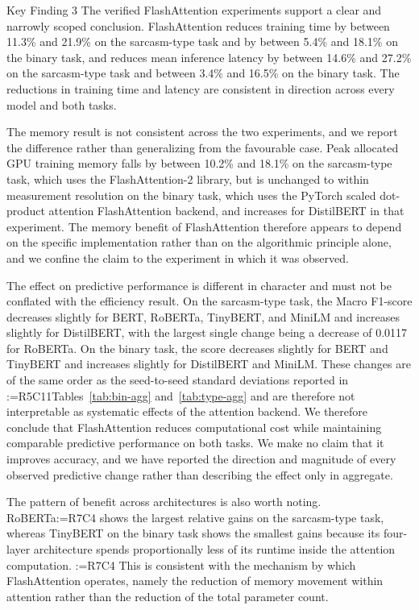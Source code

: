 \documentclass[a4paper,fleqn]{cas-sc}
\makeatletter
\newif\iftracked
\newcommand{\rv@setcolour}[1]{%
  \IfStrEq{#1}{R7C7}{\color{rvEdit}}{%
    \IfSubStr{#1}{R5}{\IfSubStr{#1}{R7}{\color{rvBoth}}{\color{rvFive}}}{\color{rvSeven}}}}
\newcommand{\rv@tag}[1]{\textsuperscript{\sffamily\bfseries\scriptsize[\StrSubstitute{#1}{,}{, }]}\,}
\newcommand{\rv@recordone}[1]{%
  \edef\rv@i{#1}%
  \ifcsdef{rv@n@\rv@i}{}{\csgdef{rv@n@\rv@i}{0}}%
  \csxdef{rv@n@\rv@i}{\the\numexpr\csuse{rv@n@\rv@i}+1\relax}%
  \begingroup\edef\@currentlabel{\rv@i}\label{rv:\rv@i:\csuse{rv@n@\rv@i}}\endgroup}
\newcommand{\rv@record}[1]{\@for\rv@id:=#1\do{\expandafter\rv@recordone\expandafter{\rv@id}}}
\DeclareRobustCommand{\rcdel}[2]{\rv@record{#1}\iftracked{\rv@setcolour{#1}\rv@tag{#1}\rv@strike{#2}}\else\unskip\fi}
\DeclareRobustCommand{\rcrep}[3]{\rv@record{#1}\iftracked{\rv@setcolour{#1}\rv@tag{#1}\rv@strike{#2} #3}\else#3\fi}
\DeclareRobustCommand{\rcnote}[2]{\rv@record{#1}\iftracked{\rv@setcolour{#1}\rv@tag{#1}\textit{[#2]}}\else\unskip\fi}
\makeatother
\begin{document}
\begin{keyfinding}{Key Finding 3}\label{box:kf3}
The verified FlashAttention experiments support a clear and narrowly scoped conclusion. FlashAttention reduces training time by between 11.3\% and 21.9\% on the sarcasm-type task and by between 5.4\% and 18.1\% on the binary task, and reduces mean inference latency by between 14.6\% and 27.2\% on the sarcasm-type task and between 3.4\% and 16.5\% on the binary task. The reductions in training time and latency are consistent in direction across every model and both tasks.

The memory result is not consistent across the two experiments, and we report the difference rather than generalizing from the favourable case. Peak allocated GPU training memory falls by between 10.2\% and 18.1\% on the sarcasm-type task, which uses the FlashAttention-2 library, but is unchanged to within measurement resolution on the binary task, which uses the PyTorch scaled dot-product attention FlashAttention backend, and increases for DistilBERT in that experiment. The memory benefit of FlashAttention therefore appears to depend on the specific implementation rather than on the algorithmic principle alone, and we confine the claim to the experiment in which it was observed.

The effect on predictive performance is different in character and must not be conflated with the efficiency result. On the sarcasm-type task, the Macro F1-score decreases slightly for BERT, RoBERTa, TinyBERT, and MiniLM and increases slightly for DistilBERT, with the largest single change being a decrease of 0.0117 for RoBERTa. On the binary task, the score decreases slightly for BERT and TinyBERT and increases slightly for DistilBERT and MiniLM. These changes are of the same order as the seed-to-seed standard deviations reported in \rcrep{R5C11}{Tables 6 and 8}{Tables~\ref{tab:bin-agg} and~\ref{tab:type-agg}} and are therefore not interpretable as systematic effects of the attention backend. We therefore conclude that FlashAttention reduces computational cost while maintaining comparable predictive performance on both tasks. We make no claim that it improves accuracy, and we have reported the direction and magnitude of every observed predictive change rather than describing the effect only in aggregate.

The pattern of benefit across architectures is also worth noting. RoBERTa\rcdel{R7C4}{, which uses the smallest batch size and consequently performs the largest number of attention operations per epoch,} shows the largest relative gains on the sarcasm-type task, whereas TinyBERT on the binary task shows the smallest gains because its four-layer architecture spends proportionally less of its runtime inside the attention computation. \rcnote{R7C4}{the deleted explanation contradicted Table~\ref{tab:hyper}, which gives the same batch size for every model} This is consistent with the mechanism by which FlashAttention operates, namely the reduction of memory movement within attention rather than the reduction of the total parameter count.
\end{keyfinding}
\end{document}
